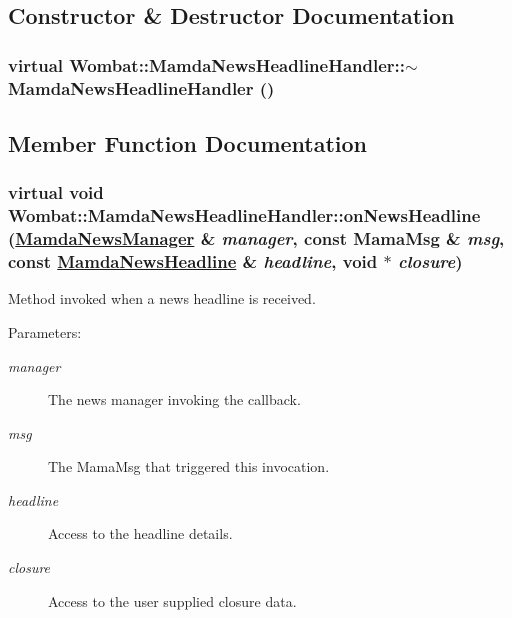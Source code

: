 \subsection{Constructor \& Destructor Documentation}
\hypertarget{classWombat_1_1MamdaNewsHeadlineHandler_c9c4b8b97e23bd71dcef739b7c724b97}{
\subsubsection[$\sim$MamdaNewsHeadlineHandler]{\setlength{\rightskip}{0pt plus 5cm}virtual Wombat::Mamda\-News\-Headline\-Handler::$\sim$Mamda\-News\-Headline\-Handler ()}}
\label{classWombat_1_1MamdaNewsHeadlineHandler_c9c4b8b97e23bd71dcef739b7c724b97}




\subsection{Member Function Documentation}
\hypertarget{classWombat_1_1MamdaNewsHeadlineHandler_68c983d4ff1d6e0e1ddbe2bc4d33c0cc}{
\subsubsection[onNewsHeadline]{\setlength{\rightskip}{0pt plus 5cm}virtual void Wombat::Mamda\-News\-Headline\-Handler::on\-News\-Headline (\hyperlink{classWombat_1_1MamdaNewsManager}{Mamda\-News\-Manager} \& {\em manager}, const Mama\-Msg \& {\em msg}, const \hyperlink{classWombat_1_1MamdaNewsHeadline}{Mamda\-News\-Headline} \& {\em headline}, void $\ast$ {\em closure})}}
\label{classWombat_1_1MamdaNewsHeadlineHandler_68c983d4ff1d6e0e1ddbe2bc4d33c0cc}


Method invoked when a news headline is received. 

\begin{Desc}
\item[Parameters:]
\begin{description}
\item[{\em manager}]The news manager invoking the callback. \item[{\em msg}]The Mama\-Msg that triggered this invocation. \item[{\em headline}]Access to the headline details. \item[{\em closure}]Access to the user supplied closure data. \end{description}
\end{Desc}
